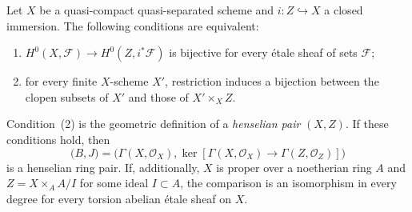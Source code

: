 \begin{theorem}\label{B:henselian-general}
Let $X$ be a quasi-compact quasi-separated scheme and $i:Z\hookrightarrow X$ a closed immersion. The following conditions are equivalent:
\begin{enumerate}
\item $H^0(X,\mathcal F)\to H^0(Z,i^*\mathcal F)$ is bijective for every \'etale sheaf of sets $\mathcal F$;
\item for every finite $X$-scheme $X'$, restriction induces a bijection between the clopen subsets of $X'$ and those of $X'\times_X Z$.
\end{enumerate}
Condition~(2) is the geometric definition of a \emph{henselian pair} $(X,Z)$. If these conditions hold, then
\[
 \bigl(B,J\bigr)=\bigl(\Gamma(X,\mathcal O_X),
 \ker[\Gamma(X,\mathcal O_X)\to\Gamma(Z,\mathcal O_Z)]\bigr)
\]
is a henselian ring pair. If, additionally, $X$ is proper over a noetherian ring $A$ and $Z=X\times_A A/I$ for some ideal $I\subset A$, the comparison is an isomorphism in every degree for every torsion abelian \'etale sheaf on $X$.
\end{theorem}

